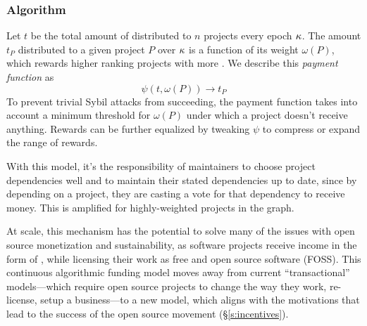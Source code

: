 \subsubsection{Algorithm} Let $t$ be the total amount of \oscoin{} distributed
to $n$ projects every epoch $\kappa$. The amount $t_P$ distributed to a given
project $P$ over $\kappa$ is a function of its \osrank{} weight $\omega(P)$,
which rewards higher ranking projects with more \oscoin{}. We describe this
\emph{payment function} as
\[
    \psi(t, \omega(P)) \to t_P
\]
To prevent trivial Sybil attacks from succeeding, the payment function takes
into account a minimum threshold for $\omega(P)$ under which a project doesn't
receive anything. Rewards can be further equalized by tweaking $\psi$ to
compress or expand the range of rewards.

With this model, it’s the responsibility of maintainers to choose project
dependencies well and to maintain their stated dependencies up to date, since
by depending on a project, they are casting a vote for that dependency to
receive money.  This is amplified for highly-weighted projects in the graph.

At scale, this mechanism has the potential to solve many of the issues with
open source monetization and sustainability, as software projects receive
income in the form of \oscoin{}, while licensing their work as free and
open source software (FOSS). This continuous algorithmic funding model moves
away from current ``transactional'' models---which require open source projects
to change the way they work, re-license, setup a business---to a new model,
which aligns with the motivations that lead to the success of the open source
movement (\S \ref{s:incentives}).
